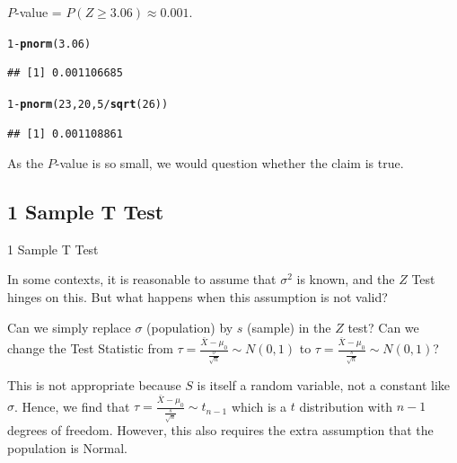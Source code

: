 \documentclass[t,xcolor=pdftex,dvipsnames,table]{beamer}
\makeatletter
\newcommand{\hlnum}[1]{\textcolor[rgb]{0.686,0.059,0.569}{#1}}%
\newcommand{\hlopt}[1]{\textcolor[rgb]{0,0,0}{#1}}%
\newcommand{\hlstd}[1]{\textcolor[rgb]{0.345,0.345,0.345}{#1}}%
\newcommand{\hlkwd}[1]{\textcolor[rgb]{0.737,0.353,0.396}{\textbf{#1}}}%
\newenvironment{kframe}{%
 \def\at@end@of@kframe{}%
 \ifinner\ifhmode%
  \def\at@end@of@kframe{\end{minipage}}%
  \begin{minipage}{\columnwidth}%
 \fi\fi%
 \def\FrameCommand##1{\hskip\@totalleftmargin \hskip-\fboxsep
 \colorbox{shadecolor}{##1}\hskip-\fboxsep
     \hskip-\linewidth \hskip-\@totalleftmargin \hskip\columnwidth}%
 \MakeFramed {\advance\hsize-\width
   \@totalleftmargin\z@ \linewidth\hsize
   \@setminipage}}%
 {\par\unskip\endMakeFramed%
 \at@end@of@kframe}
\newenvironment{knitrout}{}{} %
\makeatother
\begin{document}
\begin{frame}[fragile]{}
 $P$-value = $P( Z \geq 3.06) \approx  0.001$.

\begin{knitrout}
\color{fgcolor}\begin{kframe}
\begin{alltt}
\hlnum{1}\hlopt{-}\hlkwd{pnorm}\hlstd{(}\hlnum{3.06}\hlstd{)}
\end{alltt}
\begin{verbatim}
## [1] 0.001106685
\end{verbatim}
\begin{alltt}
\hlnum{1}\hlopt{-}\hlkwd{pnorm}\hlstd{(}\hlnum{23}\hlstd{,}\hlnum{20}\hlstd{,}\hlnum{5}\hlopt{/}\hlkwd{sqrt}\hlstd{(}\hlnum{26}\hlstd{))}
\end{alltt}
\begin{verbatim}
## [1] 0.001108861
\end{verbatim}
\end{kframe}
\end{knitrout}

 As the $P$-value is so small, we would question whether the claim is true.
\end{frame}  





\subsection[T Test]{1 Sample T Test}
\begin{frame}[fragile]{1 Sample T Test}

In some contexts, it is reasonable to assume that $\sigma^2$ is known, and the $Z$ Test hinges on this. But what happens when this assumption is not valid? 

\vspace{.5cm} Can we simply replace $\sigma$ (population) by $s$ (sample) in the $Z$ test? 
Can we change the Test Statistic from $\tau = \frac{\bar{X} - \mu_{0}}{\frac{\sigma}{\sqrt{n}}} \sim N(0,1)$ 
to $\tau = \frac{\bar{X} - \mu_{0}}{\frac{s}{\sqrt{n}}} \sim N(0,1)$?

\vspace{.5cm}
This is not appropriate because $S$ is itself a random variable, not a constant like $\sigma$.  Hence, we find that
$\tau = \frac{\bar{X} - \mu_{0}}{\frac{s}{\sqrt{n}}} \sim t_{n-1}$
which is a $t$ distribution with $n-1$ degrees of freedom. However, this also requires the extra assumption that the population is Normal.
\end{frame}
\end{document}
